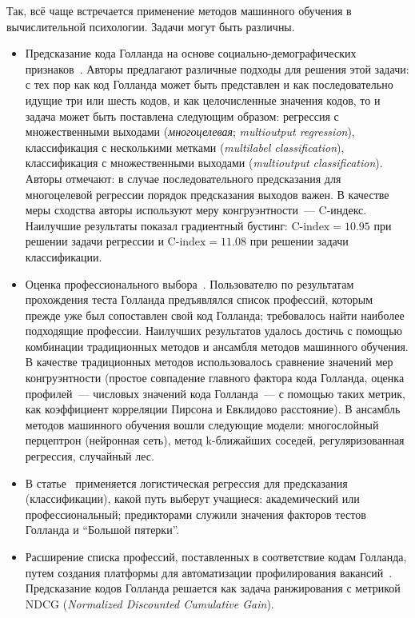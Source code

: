 Так, всё чаще встречается применение методов машинного обучения в вычислительной психологии. Задачи могут быть различны.
\begin{itemize}
    \item Предсказание кода Голланда на основе социально-демо\-графических признаков~\cite{Bogacheva}. Авторы предлагают различные подходы для решения этой задачи: с тех пор как код Голланда может быть представлен и как последовательно идущие три или шесть кодов, и как целочисленные значения кодов, то и задача может быть поставлена следующим образом: регрессия с множественными выходами (\textit{многоцелевая}; \emph{multi\-output regression}), классификация с несколькими метками (\emph{multi\-label classification}), классификация с множественными выходами (\emph{multi\-output classification}). Авторы отмечают: в случае последовательного предсказания для многоцелевой регрессии порядок предсказания выходов важен. В качестве меры сходства авторы используют меру конгруэнтности~--- C-индекс. Наилучшие результаты показал градиентный бустинг: $\text{C‑index} = 10.95$ при решении задачи регрессии и $\text{C‑index} = 11.08$ при решении задачи классификации.
    
    \item Оценка профессионального выбора~\cite{Song}. Пользователю по результатам прохождения теста Голланда предъявлялся список профессий, которым прежде уже был сопоставлен свой код Голланда; требовалось найти наиболее подходящие профессии. Наилучших результатов удалось достичь с помощью комбинации традиционных методов и ансамбля методов машинного обучения. В качестве традиционных методов использовалось сравнение значений мер конгруэнтности (простое совпадение главного фактора кода Голланда, оценка профилей~--- числовых значений кода Голланда~--- с помощью таких метрик, как коэффициент корреляции Пирсона и Евклидово расстояние). В ансамбль методов машинного обучения вошли следующие модели: многослойный перцептрон (нейронная сеть), метод k-ближайших соседей, регуляризованная регрессия, случайный лес.
    
    \item В статье~\cite{Usslepp} применяется логистическая регрессия для предсказания (классификации), какой путь выберут учащиеся: академический или профессиональный; предикторами служили значения факторов тестов Голланда и \enquote{Большой пятерки}.
    
    \item Расширение списка профессий, поставленных в соответствие кодам Голланда, путем создания платформы для автоматизации профилирования вакансий~\cite{Silva}. Предсказание кодов Голланда решается как задача ранжирования с метрикой NDCG (\textit{Normalized Discounted Cumulative Gain}).
    

\end{itemize}
